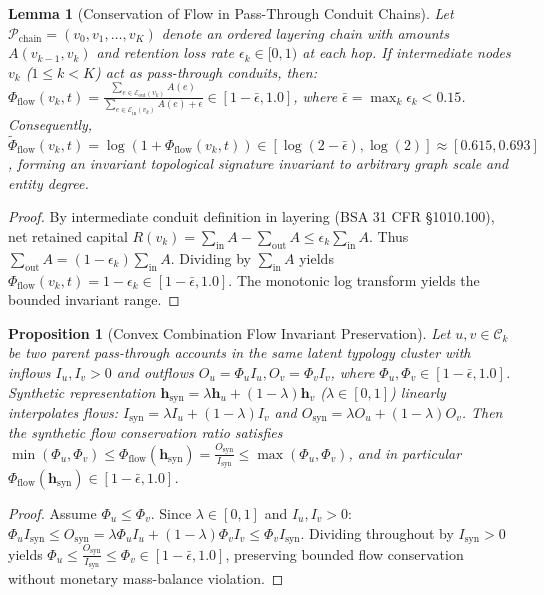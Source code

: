 \documentclass[journal,twoside]{IEEEtran}
\newtheorem{proposition}{Proposition}
\newtheorem{lemma}{Lemma}
\begin{document}
\begin{lemma}[Conservation of Flow in Pass-Through Conduit Chains]
\label{lem:flow_conservation}
Let $\mathcal{P}_{\text{chain}} = (v_0, v_1, \dots, v_K)$ denote an ordered layering chain with amounts $A(v_{k-1}, v_k)$ and retention loss rate $\epsilon_k \in [0, 1)$ at each hop. If intermediate nodes $v_k$ ($1 \le k < K$) act as pass-through conduits, then:
$\Phi_{\text{flow}}(v_k, t) = \frac{\sum_{e \in \mathcal{E}_{\text{out}}(v_k)} A(e)}{\sum_{e \in \mathcal{E}_{\text{in}}(v_k)} A(e) + \epsilon} \in \left[ 1 - \bar{\epsilon}, 1.0 \right]$,
where $\bar{\epsilon} = \max_k \epsilon_k < 0.15$. Consequently, $\tilde{\Phi}_{\text{flow}}(v_k, t) = \log(1 + \Phi_{\text{flow}}(v_k, t)) \in [\log(2 - \bar{\epsilon}), \log(2)] \approx [0.615, 0.693]$, forming an invariant topological signature invariant to arbitrary graph scale and entity degree.
\end{lemma}
\begin{proof}
By intermediate conduit definition in layering (BSA 31 CFR \S 1010.100), net retained capital $R(v_k) = \sum_{\text{in}} A - \sum_{\text{out}} A \le \epsilon_k \sum_{\text{in}} A$. Thus $\sum_{\text{out}} A = (1 - \epsilon_k) \sum_{\text{in}} A$. Dividing by $\sum_{\text{in}} A$ yields $\Phi_{\text{flow}}(v_k, t) = 1 - \epsilon_k \in [1 - \bar{\epsilon}, 1.0]$. The monotonic log transform yields the bounded invariant range.
\end{proof}

\begin{proposition}[Convex Combination Flow Invariant Preservation]
\label{prop:graphsmote_flow_preservation}
Let $u, v \in \mathcal{C}_k$ be two parent pass-through accounts in the same latent typology cluster with inflows $I_u, I_v > 0$ and outflows $O_u = \Phi_u I_u, O_v = \Phi_v I_v$, where $\Phi_u, \Phi_v \in [1 - \bar{\epsilon}, 1.0]$. Synthetic representation $\mathbf{h}_{\text{syn}} = \lambda \mathbf{h}_u + (1 - \lambda) \mathbf{h}_v$ ($\lambda \in [0, 1]$) linearly interpolates flows: $I_{\text{syn}} = \lambda I_u + (1 - \lambda) I_v$ and $O_{\text{syn}} = \lambda O_u + (1 - \lambda) O_v$. Then the synthetic flow conservation ratio satisfies $\min(\Phi_u, \Phi_v) \le \Phi_{\text{flow}}(\mathbf{h}_{\text{syn}}) = \frac{O_{\text{syn}}}{I_{\text{syn}}} \le \max(\Phi_u, \Phi_v)$, and in particular $\Phi_{\text{flow}}(\mathbf{h}_{\text{syn}}) \in [1 - \bar{\epsilon}, 1.0]$.
\end{proposition}
\begin{proof}
Assume $\Phi_u \le \Phi_v$. Since $\lambda \in [0, 1]$ and $I_u, I_v > 0$: $\Phi_u I_{\text{syn}} \le O_{\text{syn}} = \lambda \Phi_u I_u + (1 - \lambda) \Phi_v I_v \le \Phi_v I_{\text{syn}}$. Dividing throughout by $I_{\text{syn}} > 0$ yields $\Phi_u \le \frac{O_{\text{syn}}}{I_{\text{syn}}} \le \Phi_v \in [1 - \bar{\epsilon}, 1.0]$, preserving bounded flow conservation without monetary mass-balance violation.
\end{proof}
\end{document}
